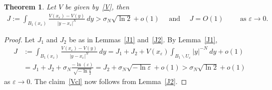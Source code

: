\documentclass[11pt]{article}
\newcommand{\eps}{{\varepsilon}}
\numberwithin{equation}{section}
\newtheorem{theorem}{Theorem}[section]
\begin{document}
\begin{theorem}\label{thm:bdry} Let $V$ be given by~\eqref{V}, then
\begin{align}\label{Vcl}
J:=\int_{B_1(x_\eps)} \frac{V(x_\eps)-V(y)}{|y-x_\eps|^N}\ dy>\sigma_N \sqrt{\ln 2}+o(1)
\quad \text{ and }\quad 
J=O(1)
\qquad \text{ as }\eps\to 0.
\end{align}
\end{theorem}
\begin{proof}
Let $J_1$ and $J_2$ be as in Lemmas~\ref{J1} and~\ref{J2}.  By Lemma~\ref{J1},
\begin{align*}
J&:=\int_{B_1(x_\eps)} \frac{V(x_\eps)-V(y)}{|y-x_\eps|^N}\ dy
=J_1+J_2+V(x_\eps)\int_{B_1\backslash U_\eps} |y|^{-N}\ dy+o(1)\\
&=J_1+J_2+\sigma_N \frac{-\ln(\eps)}{\sqrt{-\ln \frac{\eps}{2}}}
=J_2+\sigma_N \sqrt{-\ln \eps}+o(1)
>\sigma_N \sqrt{\ln 2}+o(1)
\end{align*}
as $\eps\to 0$. The claim~\eqref{Vcl} now follows from Lemma~\ref{J2}.
\end{proof}
\end{document}
